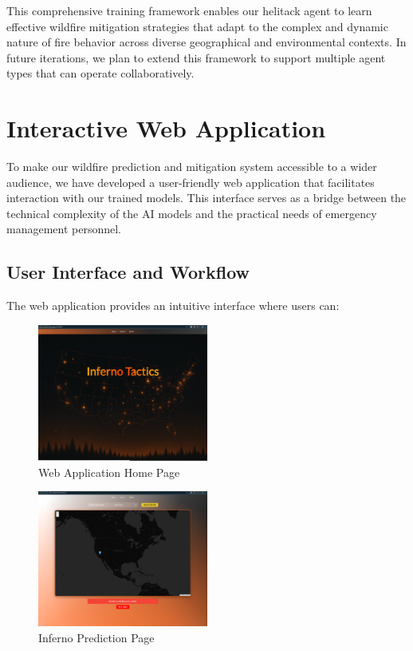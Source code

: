 \documentclass[conference]{IEEEtran}
\begin{document}
\noindent
This comprehensive training framework enables our helitack agent to learn effective wildfire mitigation strategies that adapt to the complex and dynamic nature of fire behavior across diverse geographical and environmental contexts. In future iterations, we plan to extend this framework to support multiple agent types that can operate collaboratively.

\section{Interactive Web Application}

To make our wildfire prediction and mitigation system accessible to a wider audience, we have developed a user-friendly web application that facilitates interaction with our trained models. This interface serves as a bridge between the technical complexity of the AI models and the practical needs of emergency management personnel.

\subsection{User Interface and Workflow}
The web application provides an intuitive interface where users can:

\begin{figure}[H]
    \centering
    \includegraphics[width=0.5\textwidth]{home.png}
    \caption{Web Application Home Page}
    \end{figure}

    \begin{figure}[H]
        \centering
        \includegraphics[width=0.5\textwidth]{inferno.png}
        \caption{Inferno Prediction Page}
        \end{figure}
\end{document}
